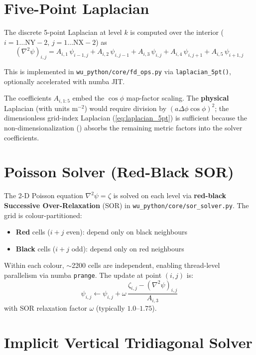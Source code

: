 \section{Five-Point Laplacian}

The discrete 5-point Laplacian at level $k$ is computed over the interior
($i=1\ldots \text{NY}-2$, $j=1\ldots \text{NX}-2$) as
\begin{equation}
  (\nabla^2 \psi)_{i,j}
  = A_{i,1}\,\psi_{i-1,j}
  + A_{i,2}\,\psi_{i,j-1}
  + A_{i,3}\,\psi_{i,j}
  + A_{i,4}\,\psi_{i,j+1}
  + A_{i,5}\,\psi_{i+1,j}
  \label{eq:laplacian_5pt}
\end{equation}

This is implemented in \texttt{wu\_python/core/fd\_ops.py} via
\texttt{laplacian\_5pt()}, optionally accelerated with numba JIT.

The coefficients $A_{i,1:5}$ embed the $\cos\phi$ map-factor scaling.
The \textbf{physical} Laplacian (with units m$^{-2}$) would require division
by $(a\Delta\phi\cos\phi)^2$; the dimensionless grid-index Laplacian
(\ref{eq:laplacian_5pt}) is sufficient because the non-dimensionalization
() absorbs the remaining metric factors into the
solver coefficients.

\section{Poisson Solver (Red-Black SOR)}

The 2-D Poisson equation $\nabla^2\psi = \zeta$ is solved on each level via
\textbf{red-black Successive Over-Relaxation} (SOR) in
\texttt{wu\_python/core/sor\_solver.py}.  The grid is colour-partitioned:
\begin{itemize}
  \item \textbf{Red} cells ($i+j$ even): depend only on black neighbours
  \item \textbf{Black} cells ($i+j$ odd): depend only on red neighbours
\end{itemize}
Within each colour, $\sim$2200 cells are independent, enabling thread-level
parallelism via numba \texttt{prange}.  The update at point $(i,j)$ is:
\begin{equation}
  \psi_{i,j} \leftarrow \psi_{i,j}
  + \omega\,\frac{\zeta_{i,j} - (\nabla^2\psi)_{i,j}}{A_{i,3}}
  \label{eq:sor_update}
\end{equation}
with SOR relaxation factor $\omega$ (typically $1.0$--$1.75$).

\section{Implicit Vertical Tridiagonal Solver}


